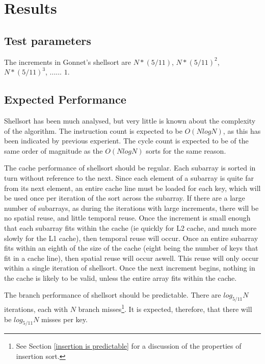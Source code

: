 
\section{Results}
\subsection{Test parameters}
The increments in Gonnet's shellsort are $N*(5/11)$, $N*(5/11)^2$, $N*(5/11)^3$,
...... $1$.

\subsection{Expected Performance}
Shellsort has been much analysed, but very little is known about the complexity
of the algorithm. The instruction count is expected to be $O(NlogN)$, as this
has been indicated by previous experient. The cycle count is expected to be of
the same order of magnitude as the $O(NlogN)$ sorts for the same reason.

The cache performance of shellsort should be regular. Each subarray is sorted in
turn without reference to the next. Since each element of a subarray is quite
far from its next element, an entire cache line must be loaded for each key,
which will be used once per iteration of the sort across the subarray. If there
are a large number of subarrays, as during the iterations with large increments,
there will be no spatial reuse, and little temporal reuse. Once the increment is
small enough that each subarray fits within the cache (ie quickly for L2 cache,
and much more slowly for the L1 cache), then temporal reuse will occur. Once an
entire subarray fits within an eighth of the size of the cache (eight being the
number of keys that fit in a cache line), then spatial reuse will occur aswell.
This reuse will only occur within a single iteration of shellsort. Once the next
increment begins, nothing in the cache is likely to be valid, unless the entire
array fits within the cache.

The branch performance of shellsort should be predictable. There are
$log_{5/11}N$ iterations, each with $N$ branch misses\footnote{See Section
\ref{insertion is predictable} for a discussion of the properties of insertion
sort.}. It is expected, therefore, that there will be $log_{5/11}N$ misses per
key.

